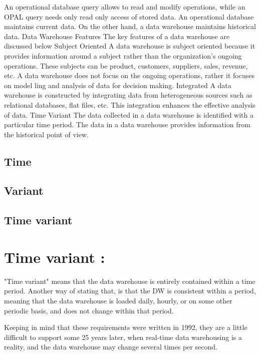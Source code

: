 \documentclass{article}
\begin{document}
An operational database query allows to read and modify operations, while an OPAL query needs only read only access of stored data.
An operational database maintains current data. On the other hand, a data warehouse maintains historical data.
Data Warehouse Features
The key features of a data warehouse are discussed below 
Subject Oriented  A data warehouse is subject oriented because it provides information around a subject rather than the organization's ongoing operations. These subjects can be product, customers, suppliers, sales, revenue, etc. A data warehouse does not focus on the ongoing operations, rather it focuses on model ling and analysis of data for decision making.
Integrated  A data warehouse is constructed by integrating data from heterogeneous sources such as relational databases, flat files, etc. This integration enhances the effective analysis of data.
Time Variant The data collected in a data warehouse is identified with a particular time period. The data in a data warehouse provides information from the historical point of view.

\begin{flushleft}

\subsection{Time}

\subsection{Variant}

\subsection{Time variant}
\end{flushleft}

 

 \newpage
 \section{ Time variant :}
 "Time variant" means that the data warehouse is entirely contained within a time period. Another way of stating that, is that the DW is consistent within a period, meaning that the data warehouse is loaded daily, hourly, or on some other periodic basis, and does not change within that period.

Keeping in mind that these requirements were written in 1992, they are a little difficult to support some 25 years later, when real-time data warehousing is a reality, and the data warehouse may change several times per second.
\end{document}
